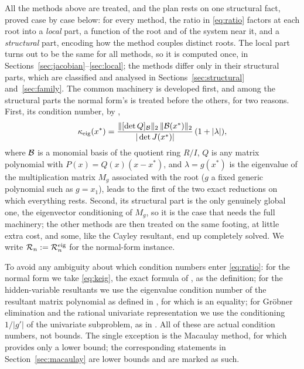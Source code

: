 All the methods above are treated, and the plan rests on one structural fact, proved case by
case below: for every method, the ratio in \eqref{eq:ratio} factors at each root into a
\emph{local} part, a function of the root and of the system near it, and a \emph{structural}
part, encoding how the method couples distinct roots. The local part turns out to be the same
for all methods, so it is computed once, in
Sections~\ref{sec:jacobian}--\ref{sec:local}; the methods differ only in their structural
parts, which are classified and analysed in Sections~\ref{sec:structural}
and~\ref{sec:family}. The common machinery is developed first, and among the structural parts
the normal form's is treated before the others, for two reasons. First, its condition number,
by \cite[Thm.~6.2]{graf2026numerical},
\begin{equation}\label{eq:keig}
  \kappa_{\mathrm{eig}}(x^*) = \frac{\|[\det Q]_{\mathcal{B}}\|_2\, \|\mathcal{B}(x^*)\|_2}{|\det J(x^*)|}\,(1+|\lambda|),
\end{equation}
where $\mathcal{B}$ is a monomial basis of the quotient ring $R/I$, $Q$ is any matrix polynomial with
$P(x)=Q(x)(x-x^*)$, and $\lambda=g(x^*)$ is the eigenvalue of the multiplication matrix $M_g$
associated with the root ($g$ a fixed generic polynomial such as $g=x_1$), leads to the first
of the two exact reductions on which everything rests. Second, its structural part is the only
genuinely global one, the eigenvector conditioning of $M_g$, so it is the case that needs the
full machinery; the other methods are then treated on the same footing, at little extra cost,
and some, like the Cayley resultant, end up completely solved. We write
$\mathcal{R}_n := \mathcal{R}_n^{\mathrm{eig}}$ for the normal-form instance.

To avoid any ambiguity about which condition numbers enter \eqref{eq:ratio}: for the normal
form we take \eqref{eq:keig}, the exact formula of \cite[Thm.~6.2]{graf2026numerical}, as the
definition; for the hidden-variable resultants we use the eigenvalue condition number of the
resultant matrix polynomial as defined in \cite[Def.~2.10]{noferini2016numerical}, for which
\cite[Lem.~2.11]{noferini2016numerical} is an equality; for Gr\"obner elimination and the
rational univariate representation we use the conditioning $1/|g'|$ of the univariate
subproblem, as in \cite{graf2026numerical}. All of these are actual condition numbers, not
bounds. The single exception is the Macaulay method, for which
\cite[Thm.~7.1]{graf2026numerical} provides only a lower bound; the corresponding statements
in Section~\ref{sec:macaulay} are lower bounds and are marked as such.

